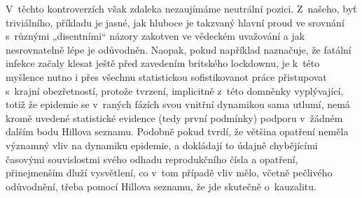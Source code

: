 V~těchto kontroverzích však zdaleka nezaujímáme neutrální pozici. Z~našeho, byť triviálního, příkladu je jasné, jak hluboce je takzvaný hlavní proud ve srovnání s~různými „disentními“
názory zakotven ve vědeckém uvažování a jak nesrovnatelně lépe je
odůvodněn. Naopak, pokud například \cite{wood2021inferring} naznačuje, že fatální infekce
začaly klesat ještě před zavedením britského lockdownu, je k~této
myšlence nutno i přes všechnu statistickou sofistikovanot práce přistupovat
s~krajní obezřetností, protože tvrzení, implicitně z~této domněnky
vyplývající, totiž že epidemie se v~raných fázích svou vnitřní dynamikou
sama utlumí, nemá kromě uvedené statistické evidence (tedy první podmínky) podporu v~žádném dalším bodu Hillova seznamu. Podobně pokud \cite{KomarekStraka2021} tvrdí, že většina opatření neměla významný vliv na dynamiku epidemie, a dokládají to údajně chybějícími časovými souvislostmi svého odhadu reprodukčního čísla a opatření, přinejmenším dluží vysvětlení, co v~tom případě vliv mělo, včetně pečlivého odůvodnění, třeba pomocí Hillova seznamu, že jde skutečně o~kauzalitu.
